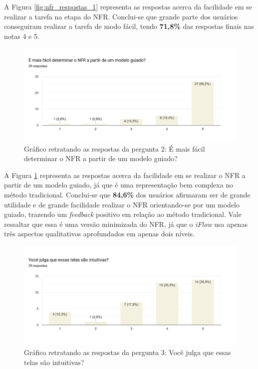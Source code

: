 A Figura \ref{fig:nfr_respostas_1} representa as respostas acerca da facilidade em se realizar a tarefa na etapa do NFR. Conclui-se que grande parte dos usuários conseguiram realizar a tarefa de modo fácil, tendo \textbf{71,8\%} das respostas finais nas notas 4 e 5.

\begin{figure}[H]
    \begin{center}
        \caption{{Gráfico retratando as respostas da pergunta 2: É mais fácil determinar o NFR a partir de um modelo guiado?}}
        \label{fig:nfr_respostas_2}
        \includegraphics[scale=0.65]{figuras/questionario/nfr-2.png}
    \end{center}
\end{figure}

A Figura \ref{fig:nfr_respostas_2} representa as respostas acerca da facilidade em se realizar o NFR a partir de um modelo guiado, já que é uma representação bem complexa no método tradicional. Conclui-se que \textbf{84,6\%} dos usuários afirmaram ser de grande utilidade e de grande facilidade realizar o NFR orientando-se por um modelo guiado, trazendo um \textit{feedback} positivo em relação ao método tradicional. Vale ressaltar que essa é uma versão minimizada do NFR, já que o \textit{iFlow} usa apenas três aspectos qualitativos aprofundados em apenas dois níveis.

\begin{figure}[]
    \begin{center}
        \caption{{Gráfico retratando as respostas da pergunta 3: Você julga que essas telas são intuitivas?}}
        \label{fig:nfr_respostas_3}
        \includegraphics[scale=0.65]{figuras/questionario/nfr-3.png}
    \end{center}
\end{figure}

